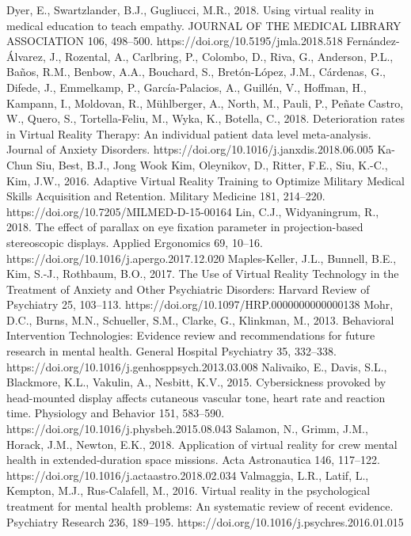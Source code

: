 \documentclass[10pt,journal,compsoc]{IEEEtran}
\begin{document}
	\begin{thebibliography}{1}
		
	\bibitem
Dyer, E., Swartzlander, B.J., Gugliucci, M.R., 2018. Using virtual reality in medical education to teach empathy. JOURNAL OF THE MEDICAL LIBRARY ASSOCIATION 106, 498–500. https://doi.org/10.5195/jmla.2018.518
\bibitem
Fernández-Álvarez, J., Rozental, A., Carlbring, P., Colombo, D., Riva, G., Anderson, P.L., Baños, R.M., Benbow, A.A., Bouchard, S., Bretón-López, J.M., Cárdenas, G., Difede, J., Emmelkamp, P., García-Palacios, A., Guillén, V., Hoffman, H., Kampann, I., Moldovan, R., Mühlberger, A., North, M., Pauli, P., Peñate Castro, W., Quero, S., Tortella-Feliu, M., Wyka, K., Botella, C., 2018. Deterioration rates in Virtual Reality Therapy: An individual patient data level meta-analysis. Journal of Anxiety Disorders. https://doi.org/10.1016/j.janxdis.2018.06.005
\bibitem
Ka-Chun Siu, Best, B.J., Jong Wook Kim, Oleynikov, D., Ritter, F.E., Siu, K.-C., Kim, J.W., 2016. Adaptive Virtual Reality Training to Optimize Military Medical Skills Acquisition and Retention. Military Medicine 181, 214–220. https://doi.org/10.7205/MILMED-D-15-00164
\bibitem
Lin, C.J., Widyaningrum, R., 2018. The effect of parallax on eye fixation parameter in projection-based stereoscopic displays. Applied Ergonomics 69, 10–16. https://doi.org/10.1016/j.apergo.2017.12.020
\bibitem
Maples-Keller, J.L., Bunnell, B.E., Kim, S.-J., Rothbaum, B.O., 2017. The Use of Virtual Reality Technology in the Treatment of Anxiety and Other Psychiatric Disorders: Harvard Review of Psychiatry 25, 103–113. https://doi.org/10.1097/HRP.0000000000000138
\bibitem
Mohr, D.C., Burns, M.N., Schueller, S.M., Clarke, G., Klinkman, M., 2013. Behavioral Intervention Technologies: Evidence review and recommendations for future research in mental health. General Hospital Psychiatry 35, 332–338. https://doi.org/10.1016/j.genhosppsych.2013.03.008
\bibitem
Nalivaiko, E., Davis, S.L., Blackmore, K.L., Vakulin, A., Nesbitt, K.V., 2015. Cybersickness provoked by head-mounted display affects cutaneous vascular tone, heart rate and reaction time. Physiology and Behavior 151, 583–590. https://doi.org/10.1016/j.physbeh.2015.08.043
\bibitem
Salamon, N., Grimm, J.M., Horack, J.M., Newton, E.K., 2018. Application of virtual reality for crew mental health in extended-duration space missions. Acta Astronautica 146, 117–122. https://doi.org/10.1016/j.actaastro.2018.02.034
\bibitem
Valmaggia, L.R., Latif, L., Kempton, M.J., Rus-Calafell, M., 2016. Virtual reality in the psychological treatment for mental health problems: An systematic review of recent evidence. Psychiatry Research 236, 189–195. https://doi.org/10.1016/j.psychres.2016.01.015

	\end{thebibliography}
	
\end{document}
